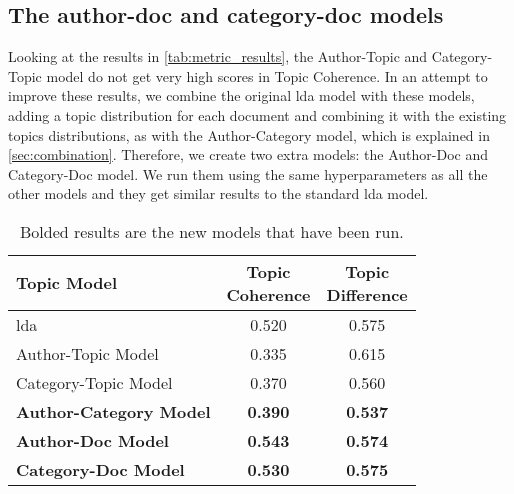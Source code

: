 \subsection{The author-doc and category-doc models}\label{subsec:app_exten_models}
Looking at the results in \autoref{tab:metric_results}, the Author-Topic and Category-Topic model do not get very high scores in Topic Coherence.
In an attempt to improve these results, we combine the original \gls{lda} model with these models, adding a topic distribution for each document and combining it with the existing topics distributions, as with the Author-Category model, which is explained in \autoref{sec:combination}.
Therefore, we create two extra models: the Author-Doc and Category-Doc model.
We run them using the same hyperparameters as all the other models and they get similar results to the standard \gls{lda} model.

\begin{table}[h]
	\centering
	\caption{Bolded results are the new models that have been run.}
	\begin{tabular}{l|c|c}
		Topic Model & \makecell{Topic \\ Coherence} & \makecell{Topic \\ Difference} \\
		\midrule
		\Acrlong{lda} & 0.520 & 0.575 \\
		Author-Topic Model & 0.335 & 0.615 \\
		Category-Topic Model & 0.370 & 0.560 \\
		\textbf{Author-Category Model} & \textbf{0.390} & \textbf{0.537} \\
		\textbf{Author-Doc Model} & \textbf{0.543} & \textbf{0.574} \\
		\textbf{Category-Doc Model} &\textbf{ 0.530} & \textbf{0.575} \\
	\end{tabular}
	\label{tab:_extra_metric_results}
\end{table}

